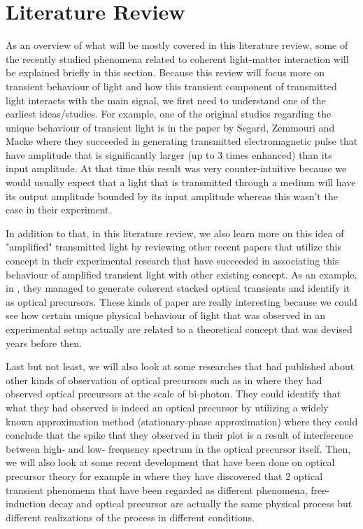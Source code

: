 \chapter{Literature Review}
As an overview of what will be mostly covered in this literature review, some of the recently studied phenomena related to coherent light-matter interaction will be explained briefly in this section. Because this review will focus more on transient behaviour of light and how this transient component of transmitted light interacts with the main signal, we first need to understand one of the earliest ideas/studies. For example, one of the original studies regarding the unique behaviour of transient light is in the paper by Segard, Zemmouri and Macke \cite{Segard_1987} where they succeeded in generating transmitted electromagnetic pulse that have amplitude that is significantly larger (up to 3 times enhanced) than its input amplitude. At that time this result was very counter-intuitive because we would usually expect that a light that is transmitted through a medium will have its output amplitude bounded by its input amplitude whereas this wasn't the case in their experiment.

In addition to that, in this literature review, we also learn more on this idea of "amplified" transmitted light by reviewing other recent papers that utilize this concept in their experimental research that have succeeded in associating this behaviour of amplified transient light with other existing concept. As an example, in \cite{jeong2010slow}, they managed to generate coherent stacked optical transients and identify it as optical precursors. These kinds of paper are really interesting because we could see how certain unique physical behaviour of light that was observed in an experimental setup actually are related to a theoretical concept that was devised years before then.

Last but not least, we will also look at some researches that had published about other kinds of observation of optical precursors such as in \cite{Du2008} where they had observed optical precursors at the scale of bi-photon. They could identify that what they had observed is indeed an optical precursor by utilizing a widely known approximation method (stationary-phase approximation) where they could conclude that the spike that they observed in their plot is a result of interference between high- and low- frequency spectrum in the optical precursor itself. Then, we will also look at some recent development that have been done on optical precursor theory for example in \cite{Chen2010} where they have discovered that 2 optical transient phenomena that have been regarded as different phenomena, free-induction decay and optical precursor are actually the same physical process  but different realizations of the process in different conditions.

